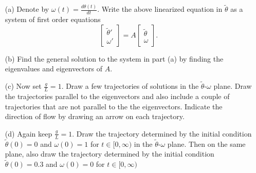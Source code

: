 \documentclass[11pt]{article}
\theoremstyle{definition}
\begin{document}
\begin{enumerate}[leftmargin=*]
\begin{center}
\end{center}

\begin{itemize}
\item [(a)] Denote by  $\omega(t)=\frac{d\theta(t)}{dt}$.  Write the above linearized equation in $\tilde \theta$ as a system of first order equations
\[
\left[\begin{array}{l} \tilde \theta'\\ \omega' \end{array}\right]=A  \left[\begin{array}{l} \tilde \theta\\ \omega \end{array}\right].
\]

\item[(b)] Find the general solution to the system in part (a) by finding the eigenvalues and eigenvectors of $A$.

\item[(c)] Now set $\frac{g}{L}=1$.   Draw a few trajectories of solutions in the $\tilde \theta$-$\omega$ plane.  Draw the trajectories parallel to the eigenvectors and also include a couple of trajectories that are not parallel to the the eigenvectors.  Indicate the direction of flow by drawing an arrow on each trajectory.

\item[(d)] Again keep $\frac{g}{L}=1$.  Draw the trajectory determined by the initial condition $\tilde \theta(0)=0$ and $\omega(0)=1$ for $t\in [0,\infty)$ in the $\tilde \theta$-$\omega$ plane.  Then on the same plane, also draw the trajectory determined by the initial condition $\tilde \theta(0)=0.3$ and $\omega(0)=0$ for $t\in [0,\infty)$  
\end{itemize}


\end{enumerate}
\end{document}
